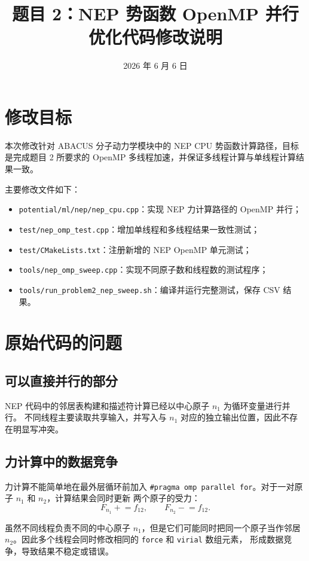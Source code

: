 \documentclass[11pt,a4paper,fontset=fandol]{ctexart}
\title{题目 2：NEP 势函数 OpenMP 并行优化代码修改说明}
\author{}
\date{2026 年 6 月 6 日}
\begin{document}
\maketitle

\section{修改目标}

本次修改针对 ABACUS 分子动力学模块中的 NEP CPU 势函数计算路径，目标是完成题目
2 所要求的 OpenMP 多线程加速，并保证多线程计算与单线程计算结果一致。

主要修改文件如下：
\begin{itemize}
  \item \texttt{potential/ml/nep/nep\_cpu.cpp}：实现 NEP 力计算路径的 OpenMP 并行；
  \item \texttt{test/nep\_omp\_test.cpp}：增加单线程和多线程结果一致性测试；
  \item \texttt{test/CMakeLists.txt}：注册新增的 NEP OpenMP 单元测试；
  \item \texttt{tools/nep\_omp\_sweep.cpp}：实现不同原子数和线程数的测试程序；
  \item \texttt{tools/run\_problem2\_nep\_sweep.sh}：编译并运行完整测试，保存 CSV 结果。
\end{itemize}

\section{原始代码的问题}

\subsection{可以直接并行的部分}

NEP 代码中的邻居表构建和描述符计算已经以中心原子 \(n_1\) 为循环变量进行并行。
不同线程主要读取共享输入，并写入与 \(n_1\) 对应的独立输出位置，因此不存在明显写冲突。

\subsection{力计算中的数据竞争}

力计算不能简单地在最外层循环前加入
\texttt{\#pragma omp parallel for}。对于一对原子 \(n_1\) 和 \(n_2\)，计算结果会同时更新
两个原子的受力：
\[
F_{n_1} \mathrel{+}= f_{12}, \qquad
F_{n_2} \mathrel{-}= f_{12}.
\]

虽然不同线程负责不同的中心原子 \(n_1\)，但是它们可能同时把同一个原子当作邻居
\(n_2\)。因此多个线程会同时修改相同的 \texttt{force} 和 \texttt{virial} 数组元素，
形成数据竞争，导致结果不稳定或错误。
\end{document}

